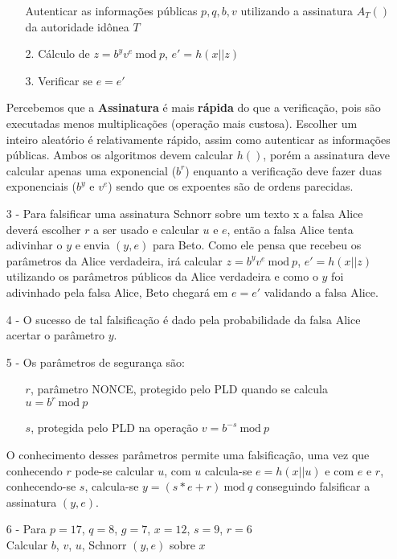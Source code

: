 \documentclass[12pt]{article}
\newcommand{\modd}{\ \text{mod}\ }
\begin{document}
\begin{itemize}
\begin{itemize}
							Autenticar as informações públicas $p, q, b, v$ utilizando
							a assinatura $A_T()$ da autoridade idônea $T$
						\item[2.]
							Cálculo de $z = b^yv^e \modd p$, $e' = h(x||z)$
						\item[3.]
							Verificar se $e = e'$	
					\end{itemize}		
				Percebemos que a \textbf{Assinatura} é mais \textbf{rápida} do que a
				verificação, pois são executadas menos multiplicações (operação mais
				custosa).  Escolher um inteiro aleatório é relativamente rápido, assim
				como autenticar as informações públicas. Ambos os algoritmos devem
				calcular $h()$, porém a assinatura deve calcular apenas uma 
				exponencial ($b^r$) enquanto a verificação deve fazer duas
				exponenciais ($b^y$ e $v^e$) sendo que os expoentes são de
				ordens parecidas.
			\item[3 -]
				Para falsificar uma assinatura Schnorr sobre um texto x a falsa
				Alice deverá escolher $r$ a ser usado e calcular $u$ e $e$,
				então a falsa Alice tenta adivinhar o $y$ e envia $(y, e)$ para Beto.
				Como ele pensa que recebeu os parâmetros da Alice verdadeira,
				irá calcular $z = b^yv^e \modd p$, $e' = h(x||z)$ utilizando
				os parâmetros públicos da Alice verdadeira e como o $y$ foi
				adivinhado pela falsa Alice, Beto chegará em $e = e'$ validando
				a falsa Alice.
			\item[4 -]
				O sucesso de tal falsificação é dado pela probabilidade da falsa
				Alice acertar o parâmetro $y$.
			\item[5 -]
				Os parâmetros de segurança são:
				\begin{itemize}
					\item[]
						$r$, parâmetro NONCE, protegido pelo PLD quando se
						calcula $u = b^r \modd p$\\
					\item[]
						$s$, protegida pelo PLD na operação $v = b^{-s} \modd p$	
				\end{itemize}	
				O conhecimento desses parâmetros permite uma falsificação, uma
				vez que conhecendo $r$ pode-se calcular $u$, com $u$ calcula-se
				$e = h(x||u)$	 e com $e$ e $r$, conhecendo-se $s$, calcula-se
				$y = (s*e + r) \modd q$	conseguindo falsificar a assinatura $(y, e)$.	
			\item[6 -]
				Para $p = 17$, $q = 8$, $g = 7$, $x = 12$, $s = 9$, $r = 6$\\
				Calcular	 $b$, $v$, $u$, Schnorr $(y, e)$ sobre $x$
				\begin{itemize}

\end{itemize}
\end{itemize}
\end{document}
